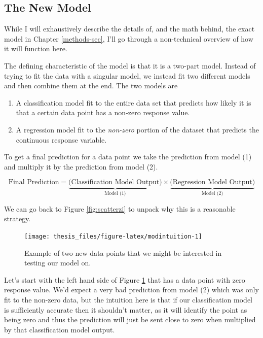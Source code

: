 \documentclass[12pt,twoside]{reedthesis}
\begin{document}
\hypertarget{the-new-model}{%
\subsection{The New Model}\label{the-new-model}}

While I will exhaustively describe the details of, and the math behind, the exact model in Chapter \ref{methods-sec}, I'll go through a non-technical overview of how it will function here.

The defining characteristic of the model is that it is a two-part model. Instead of trying to fit the data with a singular model, we instead fit two different models and then combine them at the end. The two models are
\begin{enumerate}
\def\labelenumi{\arabic{enumi}.}
\item
  A classification model fit to the entire data set that predicts how likely it is that a certain data point has a non-zero response value.
\item
  A regression model fit to the \emph{non-zero} portion of the dataset that predicts the continuous response variable.
\end{enumerate}
To get a final prediction for a data point we take the prediction from model (1) and multiply it by the prediction from model (2).

\[
\text{Final Prediction} =  \underbrace{\bigg(\text{Classification Model Output}\bigg)}_{\text{Model (1)}} \times \underbrace{\bigg(\text{Regression Model Output}\bigg)}_{\text{Model (2)}} 
\]

We can go back to Figure \ref{fig:scatterzi} to unpack why this is a reasonable strategy.
\begin{figure}

{\centering \texttt{[image: thesis\_files/figure-latex/modintuition-1]} 

}

\caption{Example of two new data points that we might be interested in testing our model on.}\label{fig:modintuition}
\end{figure}
Let's start with the left hand side of Figure \ref{fig:modintuition} that has a data point with zero response value. We'd expect a very bad prediction from model (2) which was only fit to the non-zero data, but the intuition here is that if our classification model is sufficiently accurate then it shouldn't matter, as it will identify the point as being zero and thus the prediction will just be sent close to zero when multiplied by that classification model output.
\end{document}
